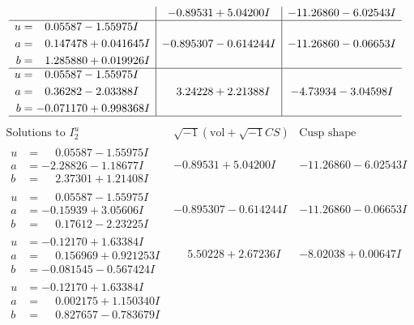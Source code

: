 \documentclass[1p]{elsarticle_modified}
\theoremstyle{definition}
\newcommand{\I}{\sqrt{-1}}
\begin{document}
$$\begin{array}{c|c|c}
 & -0.89531 + 5.04200 I & -11.26860 - 6.02543 I \\ \hline\begin{aligned}
u &= \phantom{-}0.05587 - 1.55975 I \\
a &= \phantom{-}0.147478 + 0.041645 I \\
b &= \phantom{-}1.285880 + 0.019926 I\end{aligned}
 & -0.895307 - 0.614244 I & -11.26860 - 0.06653 I \\ \hline\begin{aligned}
u &= \phantom{-}0.05587 - 1.55975 I \\
a &= \phantom{-}0.36282 - 2.03388 I \\
b &= -0.071170 + 0.998368 I\end{aligned}
 & \phantom{-}3.24228 + 2.21388 I & -4.73934 - 3.04598 I\\
 \hline 
 \end{array}$$\newpage$$\begin{array}{c|c|c}  
\text{Solutions to }I^u_{2}& \I (\text{vol} + \sqrt{-1}CS) & \text{Cusp shape}\\
 \hline 
\begin{aligned}
u &= \phantom{-}0.05587 - 1.55975 I \\
a &= -2.28826 - 1.18677 I \\
b &= \phantom{-}2.37301 + 1.21408 I\end{aligned}
 & -0.89531 + 5.04200 I & -11.26860 - 6.02543 I \\ \hline\begin{aligned}
u &= \phantom{-}0.05587 - 1.55975 I \\
a &= -0.15939 + 3.05606 I \\
b &= \phantom{-}0.17612 - 2.23225 I\end{aligned}
 & -0.895307 - 0.614244 I & -11.26860 - 0.06653 I \\ \hline\begin{aligned}
u &= -0.12170 + 1.63384 I \\
a &= \phantom{-}0.156969 + 0.921253 I \\
b &= -0.081545 - 0.567424 I\end{aligned}
 & \phantom{-}5.50228 + 2.67236 I & -8.02038 + 0.00647 I \\ \hline\begin{aligned}
u &= -0.12170 + 1.63384 I \\
a &= \phantom{-}0.002175 + 1.150340 I \\
b &= \phantom{-}0.827657 - 0.783679 I\end{aligned}

\end{array}$$
\end{document}
